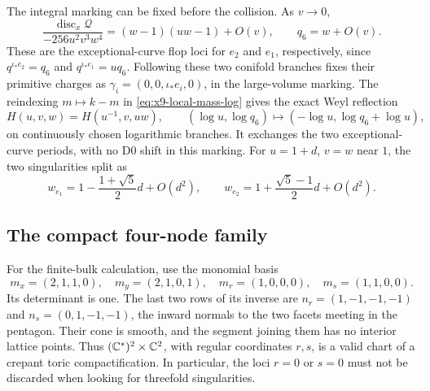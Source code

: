 The integral marking can be fixed before the collision. As $v\to0$,
\begin{equation}
 \frac{\operatorname{disc}_x\mathcal Q}{-256u^2v^3w^4}
 =(w-1)(uw-1)+O(v),\qquad q_6=w+O(v).
 \label{eq:x9-local-flop-marking}
\end{equation}
These are the exceptional-curve flop loci for $e_2$ and $e_1$,
respectively, since $q^{\iota_*e_2}=q_6$ and
$q^{\iota_*e_1}=u q_6$. Following these two conifold branches
fixes their primitive charges as
$\gamma_i=(0,0,\iota_*e_i,0)$, in the large-volume marking.
The reindexing $m\mapsto k-m$ in
\eqref{eq:x9-local-mass-log} gives the exact Weyl reflection
\begin{equation}
 H(u,v,w)=H(u^{-1},v,uw),\qquad
 (\log u,\log q_6)\longmapsto(-\log u,\log q_6+\log u),
 \label{eq:x9-local-weyl-period}
\end{equation}
on continuously chosen logarithmic branches. It exchanges the
two exceptional-curve periods, with no D0 shift in this marking.
For $u=1+d$, $v=w$ near $1$, the two singularities split as
\begin{equation}
 w_{e_1}=1-\frac{1+\sqrt5}{2}d+O(d^2),\qquad
 w_{e_2}=1+\frac{\sqrt5-1}{2}d+O(d^2).
 \label{eq:x9-local-mass-splitting}
\end{equation}
\subsection{The compact four-node family}
For the finite-bulk calculation, use the monomial basis
\begin{equation}
 m_x=(2,1,1,0),\quad m_y=(2,1,0,1),\quad
 m_r=(1,0,0,0),\quad m_s=(1,1,0,0).
 \label{eq:x9-bulk-monomial-basis}
\end{equation}
Its determinant is one. The last two rows of its inverse are
$n_r=(1,-1,-1,-1)$ and $n_s=(0,1,-1,-1)$, the inward normals
to the two facets meeting in the pentagon. Their cone is smooth,
and the segment joining them has no interior lattice points.
Thus $(\mathbb C^*)^2\times\mathbb C^2$, with regular coordinates $r,s$,
is a valid chart of a crepant toric compactification. In particular,
the loci $r=0$ or $s=0$ must not be discarded when looking for
threefold singularities.

